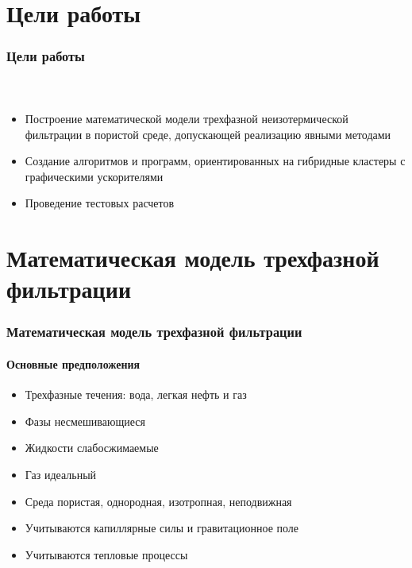 \section{Цели работы}

\begin{frame}
\begin{center}
\frametitle{Цели работы}
\framesubtitle{\ }
\begin{itemize}
\item {\large Построение математической модели трехфазной неизотермической фильтрации в пористой среде, допускающей реализацию явными методами\\}
\vspace{0.5cm}
\item {\large Создание алгоритмов и программ, ориентированных на гибридные кластеры с графическими ускорителями\\}
\vspace{0.5cm}
\item {\large Проведение тестовых расчетов}
\end{itemize}
\end{center}
\end{frame}

\section{Математическая модель трехфазной фильтрации}

\begin{frame}
\begin{center}
\frametitle{Математическая модель трехфазной фильтрации}
\framesubtitle{Основные предположения}
\begin{itemize}
\item Трехфазные течения: вода, легкая нефть и газ
\vspace{0.3cm}
\item Фазы несмешивающиеся
\vspace{0.3cm}
\item Жидкости слабосжимаемые
\vspace{0.3cm}
\item Газ идеальный
\vspace{0.3cm}
\item Среда пористая, однородная, изотропная, неподвижная
\vspace{0.3cm}
\item Учитываются капиллярные силы и гравитационное поле
\vspace{0.3cm}
\item Учитываются тепловые процессы
\end{itemize}
\end{center}
\end{frame}

